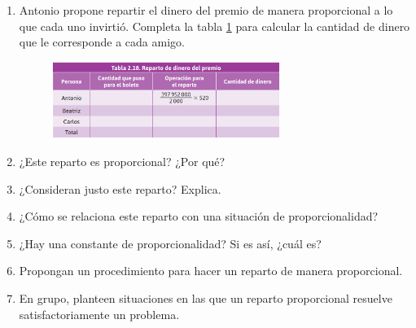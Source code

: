 \documentclass[11pt]{book}
\begin{document}
\begin{enumerate}
\begin{enumerate}
\begin{figure}[H]
                \end{figure}
          \item Antonio propone repartir el dinero del premio de manera proporcional a lo que cada uno invirtió. Completa la tabla \ref{tab:reparto_dinero} para calcular la cantidad de dinero que le corresponde a cada amigo.
                \begin{figure}[H]
                  \centering
                  \includegraphics[width=0.7\textwidth]{tabla2.18.png}
                  \label{tab:reparto_dinero}
                \end{figure}
          \item ¿Este reparto es proporcional? ¿Por qué?
          \item ¿Consideran justo este reparto? Explica.
          \item ¿Cómo se relaciona este reparto con una situación de proporcionalidad?
          \item ¿Hay una constante de proporcionalidad? Si es así, ¿cuál es?
          \item Propongan un procedimiento para hacer un reparto de manera proporcional.
          \item En grupo, planteen situaciones en las que un reparto proporcional resuelve satisfactoriamente un problema.
        \end{enumerate}
\end{enumerate}
\end{document}
